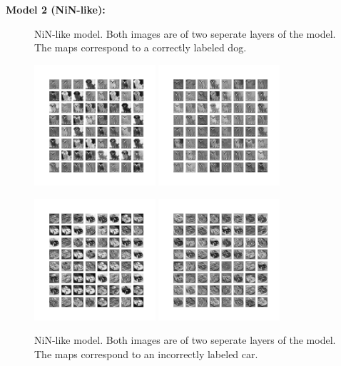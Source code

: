 \documentclass{article}[12pt]
\begin{document}
\begin{enumerate}[(a)]
    \textbf{Model 2 (NiN-like):}
    \begin{figure}[H]
        \centering
            \caption{NiN-like model. Both images are of two seperate layers of the model. The maps correspond to a correctly labeled dog.}
            \includegraphics[width=0.4\textwidth]{layer1_correct_dog4_newmodel.png}
            \includegraphics[width=0.4\textwidth]{layer2_correct_dog4_newmodel.png}\\
            \caption{NiN-like model. Both images are of two seperate layers of the model. The maps correspond to an incorrectly labeled car.}
            \includegraphics[width=0.4\textwidth]{layer1_incorrect_automobile10_newmodel.png}
            \includegraphics[width=0.4\textwidth]{layer2_incorrect_automobile10_newmodel.png}
    \end{figure}


\end{enumerate}
\end{document}
